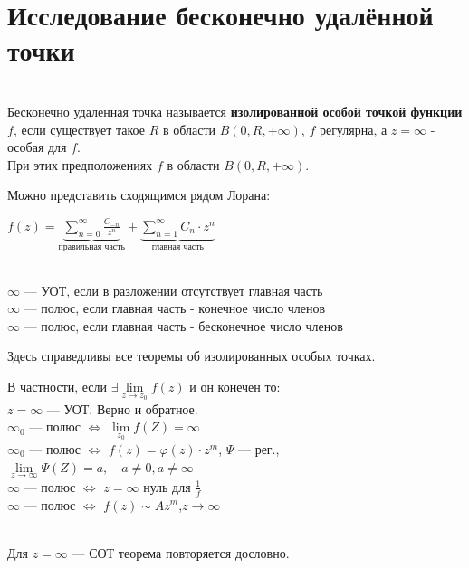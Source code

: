 \documentclass[a4paper, 12pt]{report}
\begin{document}
	\section{Исследование бесконечно удалённой точки}
	\\ Бесконечно удаленная точка называется \textbf{изолированной особой точкой функции $f$}, если существует такое $R$ в области $B(0, R, +\infty)$, $f$ регулярна, а $z = \infty$ - особая для $f$.  
	\\При этих предположениях $f$ в области $B(0, R, +\infty)$. 
	\par\bigskip Можно представить сходящимся рядом Лорана:
	\begin{center}
	    $f(z) = \underbrace{\sum\limits_{n = 0}^{\infty} \frac{C_{-n}}{z^n}}_{\text{правильная часть}} + \underbrace{\sum\limits_{n = 1}^{\infty} C_n\cdot z^n}_{\text{главная часть}}$
	\end{center}
	\\ $\infty$ --- УОТ, если в разложении отсутствует главная часть
	\\ $\infty$ --- полюс, если главная часть - конечное число членов	
	\\ $\infty$ --- полюс, если главная часть - бесконечное число членов
	\par\bigskip Здесь справедливы все теоремы об изолированных особых точках. 
	\par\bigskip В частности, если $\exists \lim\limits_{z \to z_0}f(z)$ и он конечен то:
	\\ $ z =\infty$ --- УОТ. Верно и обратное. 
	\bigskip
	\\$\infty_0$ --- полюс \quad $\iff$ \quad $\lim\limits_{z_0}f(Z) = \infty$
	\\$\infty_0$ --- полюс \quad $\iff$ \quad $f(z)  = \varphi(z) \cdot z^m$, \quad $\Psi$ --- рег.,\quad $\lim\limits_{z \to \infty}\Psi(Z) = a,\quad a \neq 0, a \neq \infty$
	\\$\infty$ --- полюс \quad $\iff$ \quad $z = \infty$ \; нуль для\; $\frac{1}{f}$
	\\$\infty$ --- полюс \quad $\iff$ \quad $f(z) \mathtt{\sim} Az^m$,\quad $z \to \infty$
	\par\bigskip
	\\Для $z = \infty$ --- СОТ теорема повторяется дословно.
	
	
	
	
	
\end{document}
